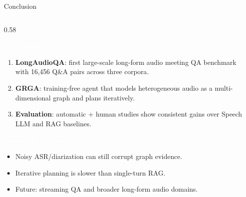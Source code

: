 \documentclass[aspectratio=169,10pt]{beamer}
\newcommand{\tightitems}{\setlength\itemsep{0.12em}\setlength\parsep{0pt}\setlength\topsep{0.1em}}
\begin{document}
\begin{frame}[t]{Conclusion}
  \vspace{-0.06cm}
  \begin{columns}[T]
    \begin{column}{0.58\textwidth}
      \begin{block}{\textcolor{white}{Contributions}}
        \footnotesize
        \begin{enumerate}\tightitems
          \item \textbf{LongAudioQA}: first large-scale long-form audio meeting QA
                benchmark with 16,456 Q\&A pairs across three corpora.
          \item \textbf{GRGA}: training-free agent that models heterogeneous audio
                as a multi-dimensional graph and plans iteratively.
          \item \textbf{Evaluation}: automatic + human studies show consistent
                gains over Speech LLM and RAG baselines.
        \end{enumerate}
      \end{block}

      \vspace{0.16cm}
      \begin{alertblock}{\textcolor{white}{Limitations \& Future Work}}
        \footnotesize
        \begin{itemize}\tightitems
          \item Noisy ASR/diarization can still corrupt graph evidence.
          \item Iterative planning is slower than single-turn RAG.
          \item Future: streaming QA and broader long-form audio domains.
        \end{itemize}
      \end{alertblock}
    \end{column}


\end{columns}
\end{frame}
\end{document}
